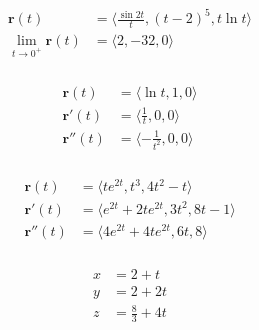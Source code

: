 \documentclass{article}
\begin{document}
\setcounter{subsubsection}{14}
\subsubsection{}

\begin{align*}
  \mathbf{r}(t)                          & = \langle \frac{\sin 2 t}{t}, (t - 2)^5, t \ln t \rangle \\
  \lim_{t \rightarrow 0^+} \mathbf{r}(t) & = \langle 2, -32, 0 \rangle
\end{align*}

\setcounter{subsubsection}{16}
\subsubsection{}

\begin{align*}
  \mathbf{r}(t)   & = \langle \ln t, 1, 0 \rangle          \\
  \mathbf{r}'(t)  & = \langle \frac{1}{t}, 0, 0 \rangle    \\
  \mathbf{r}''(t) & = \langle -\frac{1}{t^2}, 0, 0 \rangle
\end{align*}

\setcounter{subsubsection}{18}
\subsubsection{}

\begin{align*}
  \mathbf{r}(t)   & = \langle t e^{2 t}, t^3, 4 t^2 - t \rangle             \\
  \mathbf{r}'(t)  & = \langle e^{2 t} + 2 t e^{2 t}, 3 t^2, 8 t - 1 \rangle \\
  \mathbf{r}''(t) & = \langle 4 e^{2 t} + 4 t e^{2 t}, 6 t, 8 \rangle
\end{align*}

\setcounter{subsubsection}{24}
\subsubsection{}

\begin{align*}
  x & = 2 + t             \\
  y & = 2 + 2 t           \\
  z & = \frac{8}{3} + 4 t
\end{align*}

\setcounter{subsubsection}{26}
\subsubsection{}
\end{document}
